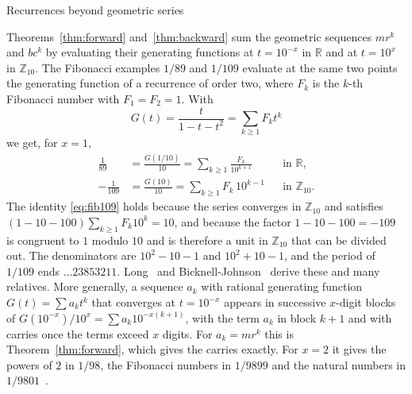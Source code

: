 \documentclass[11pt,a4paper]{amsart}
\makeatletter
\def\section{\@startsection{section}{1}%
  \z@{-.7\linespacing\@plus-\linespacing}{.5\linespacing}%
  {\normalfont\scshape\centering}}
\theoremstyle{definition}
\theoremstyle{remark}
\newcommand{\Ztena}{\mathbb{Z}_{10}}
\makeatother
\begin{document}
\section{Recurrences beyond geometric series}\label{sec:recurrences}

Theorems~\ref{thm:forward} and~\ref{thm:backward} sum the geometric sequences $m r^k$ and $b c^k$ by evaluating their generating functions at $t = 10^{-x}$ in $\mathbb{R}$ and at $t = 10^x$ in $\Ztena$. The Fibonacci examples $1/89$ and $1/109$ evaluate at the same two points the generating function of a recurrence of order two, where $F_k$ is the $k$-th Fibonacci number with $F_1 = F_2 = 1$. With
\begin{equation}\label{eq:G}
G(t) = \frac{t}{1 - t - t^2} = \sum_{k\ge1} F_k t^k
\end{equation}
we get, for $x = 1$,
\begin{align}
\frac{1}{89} &= \frac{G(1/10)}{10} = \sum_{k\ge1}\frac{F_k}{10^{k+1}}
  && \text{in } \mathbb{R}, \label{eq:fib}\\
-\frac{1}{109} &= \frac{G(10)}{10} = \sum_{k\ge1} F_k\, 10^{k-1}
  && \text{in } \Ztena . \label{eq:fib109}
\end{align}
The identity \eqref{eq:fib109} holds because the series converges in $\Ztena$ and satisfies $(1 - 10 - 100)\sum_{k\ge1} F_k 10^k = 10$, and because the factor $1 - 10 - 100 = -109$ is congruent to $1$ modulo $10$ and is therefore a unit in $\Ztena$ that can be divided out. The denominators are
$10^2 - 10 - 1$ and $10^2 + 10 - 1$, and the period of $1/109$ ends
$\dots 23853211$. Long~\cite{long1981} and Bicknell-Johnson~\cite{bicknell1989}
derive these and many relatives. More generally, a sequence $a_k$ with rational generating function $G(t) = \sum a_k t^k$ that converges at $t = 10^{-x}$
appears in successive $x$-digit blocks of $G(10^{-x})/10^x = \sum a_k 10^{-x(k+1)}$, with the term $a_k$ in block $k+1$ and with carries once the terms exceed $x$ digits. For $a_k = m r^k$ this is Theorem~\ref{thm:forward},
which gives the carries exactly. For $x = 2$ it gives the powers of $2$ in
$1/98$, the Fibonacci numbers in $1/9899$ and the natural numbers in
$1/9801$~\cite{munafo}.
\end{document}
